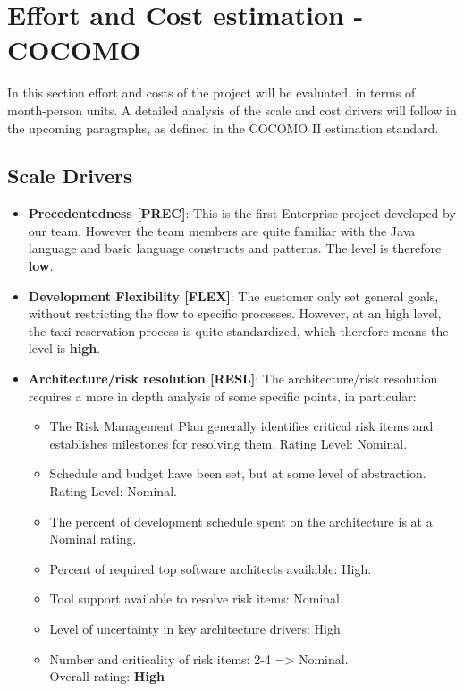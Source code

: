 \section{Effort and Cost estimation - COCOMO}
In this section effort and costs of the project will be evaluated, in terms of month-person units. A detailed analysis of the scale and cost drivers will follow in the upcoming paragraphs, as defined in the COCOMO II estimation standard.\\

\subsection{Scale Drivers}
    \begin{itemize}
        \item \textbf{Precedentedness [PREC]}: This is the first Enterprise project developed by our team. However the team members are quite familiar with the Java language and basic language constructs and patterns. The level is therefore \textbf{low}.
        
        \item \textbf{Development Flexibility [FLEX]}: The customer only set general goals, without restricting the flow to specific processes. However, at an high level, the taxi reservation process is quite standardized, which therefore means the level is \textbf{high}.
        
        \item \textbf{Architecture/risk resolution [RESL]}: 
        The architecture/risk resolution requires a more in depth analysis of some specific points, in particular:
        \begin{itemize}
            \item The Risk Management Plan generally identifies critical risk items and establishes milestones for resolving them. Rating Level: Nominal.
            \item Schedule and budget have been set, but at some level of abstraction. Rating Level: Nominal.
            \item The percent of development schedule spent on the architecture is at a Nominal rating.
            \item Percent of required top software architects available: High.
            \item Tool support available to resolve risk items: Nominal.
            \item Level of uncertainty in key architecture drivers: High
            \item Number and criticality of risk items: 2-4 => Nominal.
            \\Overall rating: \textbf{High}
        \end{itemize}
        

\end{itemize}
